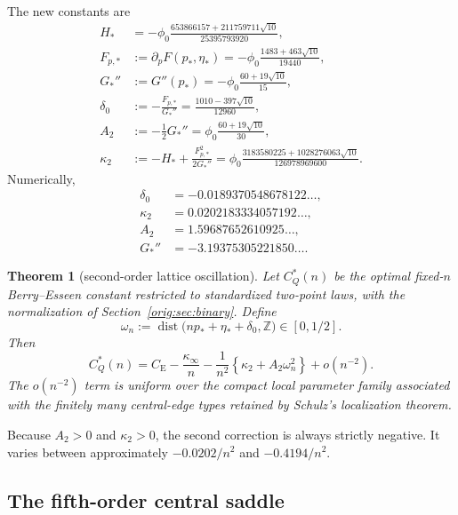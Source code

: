 \documentclass[11pt,a4paper]{article}
\numberwithin{equation}{section}
\newtheorem{theorem}{Theorem}[section]
\theoremstyle{definition}
\theoremstyle{remark}
\newcommand{\CE}{C_{\mathrm E}}
\newcommand{\phiZ}{\phi_0}
\DeclareMathOperator{\dist}{dist}
\begin{document}
The new constants are
\begin{align}
 H_*&=-\phiZ\frac{653866157+211759711\sqrt{10}}{25395793920},
 \label{bin:eq:Hstar}\\
 F_{p,*}&:=\partial_pF(p_*,\eta_*)
 =-\phiZ\frac{1483+463\sqrt{10}}{19440},
 \label{bin:eq:Fpstar}\\
 G_*''&:=G''(p_*)
 =-\phiZ\frac{60+19\sqrt{10}}{15},
 \label{bin:eq:Gppstar}\\
 \delta_0&:=-\frac{F_{p,*}}{G_*''}
 =\frac{1010-397\sqrt{10}}{12960},
 \label{bin:eq:delta0}\\
 A_2&:=-\frac12G_*''
 =\phiZ\frac{60+19\sqrt{10}}{30},
 \label{bin:eq:A2}\\
 \kappa_2&:=-H_*+\frac{F_{p,*}^2}{2G_*''}
 =\phiZ\frac{3183580225+1028276063\sqrt{10}}
 {126978969600}.
 \label{bin:eq:kappa2}
\end{align}
Numerically,
\begin{align*}
 \delta_0&=-0.0189370548678122\ldots,\\
 \kappa_2&=0.0202183334057192\ldots,\\
 A_2&=1.59687652610925\ldots,\\
 G_*''&=-3.19375305221850\ldots.
\end{align*}

\begin{theorem}[second-order lattice oscillation]\label{bin:thm:main}
Let $C_Q^*(n)$ be the optimal fixed-$n$ Berry--Esseen constant restricted
to standardized two-point laws, with the normalization of Section~\ref{orig:sec:binary}.
Define
\begin{equation}\label{bin:eq:omega}
 \omega_n:=\dist\bigl(np_*+\eta_*+\delta_0,\mathbb Z\bigr)
 \in[0,1/2].
\end{equation}
Then
\begin{equation}\label{bin:eq:main}
 \boxed{
 C_Q^*(n)=\CE-\frac{\kappa_\infty}{n}
 -\frac1{n^2}
 \left\{\kappa_2+A_2\omega_n^2\right\}
 +o(n^{-2}).
 }
\end{equation}
The $o(n^{-2})$ term is uniform over the compact local parameter family
associated with the finitely many central-edge types retained by Schulz's
localization theorem.
\end{theorem}

Because $A_2>0$ and $\kappa_2>0$, the second correction is always strictly negative.  It
varies between approximately $-0.0202/n^2$ and $-0.4194/n^2$.

\subsection{The fifth-order central saddle}
\end{document}
